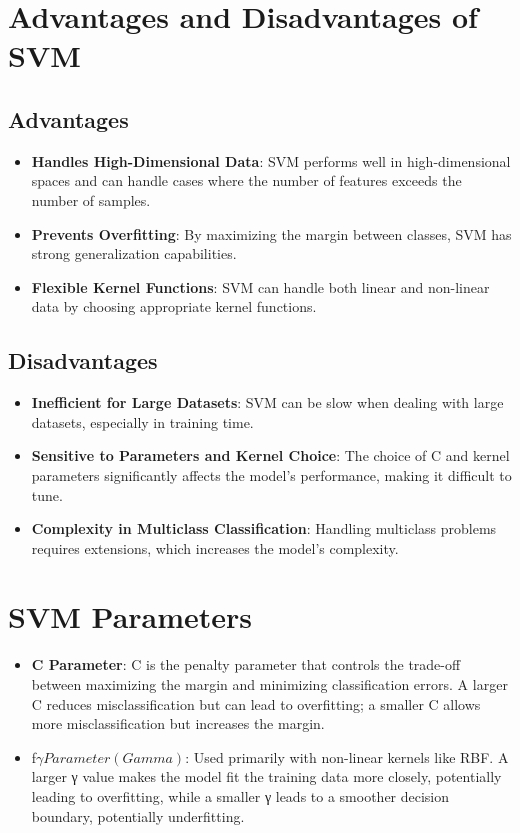 \documentclass{article}
\begin{document}
	\section{Advantages and Disadvantages of SVM}
	
	\subsection{Advantages}
	
	\begin{itemize}
		\item \textbf{Handles High-Dimensional Data}: SVM performs well in high-dimensional spaces and can handle cases where the number of features exceeds the number of samples.
		\item \textbf{Prevents Overfitting}: By maximizing the margin between classes, SVM has strong generalization capabilities.
		\item \textbf{Flexible Kernel Functions}: SVM can handle both linear and non-linear data by choosing appropriate kernel functions.
	\end{itemize}
	
	\subsection{Disadvantages}
	
	\begin{itemize}
		\item \textbf{Inefficient for Large Datasets}: SVM can be slow when dealing with large datasets, especially in training time.
		\item \textbf{Sensitive to Parameters and Kernel Choice}: The choice of C and kernel parameters significantly affects the model's performance, making it difficult to tune.
		\item \textbf{Complexity in Multiclass Classification}: Handling multiclass problems requires extensions, which increases the model's complexity.
	\end{itemize}
	
	\section{SVM Parameters}
	
	\begin{itemize}
		\item \textbf{C Parameter}: C is the penalty parameter that controls the trade-off between maximizing the margin and minimizing classification errors. A larger C reduces misclassification but can lead to overfitting; a smaller C allows more misclassification but increases the margin.
		\item \textb f${γ Parameter (Gamma)}$: Used primarily with non-linear kernels like RBF. A larger γ value makes the model fit the training data more closely, potentially leading to overfitting, while a smaller γ leads to a smoother decision boundary, potentially underfitting.
	\end{itemize}
	
\end{document}

